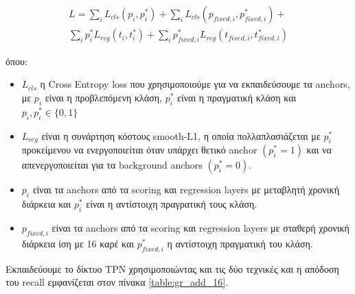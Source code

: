 


\en
\begin{equation} 
\begin{split}
 L  =  \sum_iL_{cls}(p_i, p_i^*) + \sum_iL_{cls}(p_{fixed,i}, p_{fixed,i}^*) + \\
   \sum_ip_i^*L_{reg}(t_i,t_i^*) + \sum_ip_{fixed,i}^*L_{reg}(t_{fixed,i},t_{fixed,i}^*) 
\end{split}
\end{equation}
\gr

όπου:
\begin{itemize}
\item\en $L_{cls} $  η \en Cross Entropy loss \gr που χρησιμοποιούμε για να εκπαιδεύσουμε τα \en anchors\gr, με \en $p_i$ \gr είναι η προβλεπόμενη κλάση, \en $p_i^*$ \gr είναι
  η πραγματική κλάση και   \en $p_i, p_i^* \in \{0,1\}$
\item\en $L_{reg} $ \gr είναι η συνάρτηση κόστους \en smooth-L1\gr, η οποία πολλαπλασιάζεται με \en $p_i^*$ \gr προκείμενου να ενεργοποιείται όταν υπάρχει θετικό \en anchor $(p_i^* = 1)$ \gr
  και να απενεργοποιείται για τα \en background anchors $(p_i^* = 0)$.
\item\en $p_i $ \gr είναι τα \en anchors \gr από τα \en scoring \gr και \en regression layers \gr με μεταβλητή χρονική διάρκεια και  \en $p_i^*$ \gr είναι η αντίστοιχη πραγρατική τους κλάση.
\item\en $p_{fixed,i} $ \gr είναι τα \en anchors \gr από τα \en scoring \gr και \en regression layers \gr με σταθερή χρονική διάρκεια ίση με 16 καρέ και \en $p_{fixed,i}^*$   η
  αντίστοιχη πραγματική του κλάση.

\end{itemize}

Εκπαιδεύουμε το δίκτυο \en TPN \gr χρησιμοποιώντας και τις δύο τεχνικές και η  απόδοση του \en recall \gr εμφανίζεται στον πίνακα  \ref{table:gr_add_16}.

